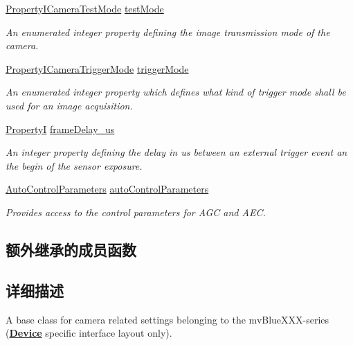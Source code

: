 \begin{DoxyCompactItemize}
\hyperlink{group___device_specific_interface_gac0b281150a89dd23bb2a696aba431225}{Property\+I\+Camera\+Test\+Mode} \hyperlink{classmv_i_m_p_a_c_t_1_1acquire_1_1_camera_settings_blue_device_a986bc69aacf955629a6c3d0cf5971dc5}{test\+Mode}
\begin{DoxyCompactList}\small\item\em An enumerated integer property defining the image transmission mode of the camera. \end{DoxyCompactList}\item 
\hyperlink{group___device_specific_interface_gad47fbc49f6f36b45b3458aef7a61849a}{Property\+I\+Camera\+Trigger\+Mode} \hyperlink{classmv_i_m_p_a_c_t_1_1acquire_1_1_camera_settings_blue_device_a736a6e90f7bb19b4f10e7ff0110c657e}{trigger\+Mode}
\begin{DoxyCompactList}\small\item\em An enumerated integer property which defines what kind of trigger mode shall be used for an image acquisition. \end{DoxyCompactList}\item 
\hyperlink{group___common_interface_ga12d5e434238ca242a1ba4c6c3ea45780}{Property\+I} \hyperlink{classmv_i_m_p_a_c_t_1_1acquire_1_1_camera_settings_blue_device_a73d838f2083f213c50ee6d2b161ad703}{frame\+Delay\+\_\+us}
\begin{DoxyCompactList}\small\item\em An integer property defining the delay in us between an external trigger event an the begin of the sensor exposure. \end{DoxyCompactList}\item 
\hyperlink{classmv_i_m_p_a_c_t_1_1acquire_1_1_auto_control_parameters}{Auto\+Control\+Parameters} \hyperlink{classmv_i_m_p_a_c_t_1_1acquire_1_1_camera_settings_blue_device_af360308aed6a5ebc938f4fd19b2ebe6f}{auto\+Control\+Parameters}
\begin{DoxyCompactList}\small\item\em Provides access to the control parameters for A\+G\+C and A\+E\+C. \end{DoxyCompactList}\end{DoxyCompactItemize}
\subsection*{额外继承的成员函数}


\subsection{详细描述}
A base class for camera related settings belonging to the mv\+Blue\+X\+X\+X-\/series ({\bfseries \hyperlink{classmv_i_m_p_a_c_t_1_1acquire_1_1_device}{Device}} specific interface layout only). 


